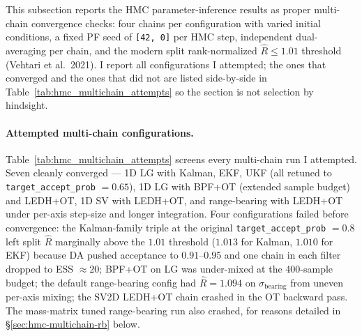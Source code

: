 \documentclass{article}
\begin{document}
This subsection reports the HMC parameter-inference results as proper multi-chain convergence checks: four chains per configuration with varied initial conditions, a fixed PF seed of \texttt{[42, 0]} per HMC step, independent dual-averaging per chain, and the modern split rank-normalized $\hat R \le 1.01$ threshold (Vehtari et al.\ 2021). I report all configurations I attempted; the ones that converged and the ones that did not are listed side-by-side in Table~\ref{tab:hmc_multichain_attempts} so the section is not selection by hindsight.

\paragraph{Attempted multi-chain configurations.}
Table~\ref{tab:hmc_multichain_attempts} screens every multi-chain run I attempted. Seven cleanly converged --- 1D LG with Kalman, EKF, UKF (all retuned to \texttt{target\_accept\_prob} $= 0.65$), 1D LG with BPF+OT (extended sample budget) and LEDH+OT, 1D SV with LEDH+OT, and range-bearing with LEDH+OT under per-axis step-size and longer integration. Four configurations failed before convergence: the Kalman-family triple at the original \texttt{target\_accept\_prob} $= 0.8$ left split $\hat R$ marginally above the $1.01$ threshold ($1.013$ for Kalman, $1.010$ for EKF) because DA pushed acceptance to $0.91$--$0.95$ and one chain in each filter dropped to ESS $\approx 20$; BPF+OT on LG was under-mixed at the 400-sample budget; the default range-bearing config had $\hat R = 1.094$ on $\sigma_{\text{bearing}}$ from uneven per-axis mixing; the SV2D LEDH+OT chain crashed in the OT backward pass. The mass-matrix tuned range-bearing run also crashed, for reasons detailed in \S\ref{sec:hmc-multichain-rb} below.
\end{document}
